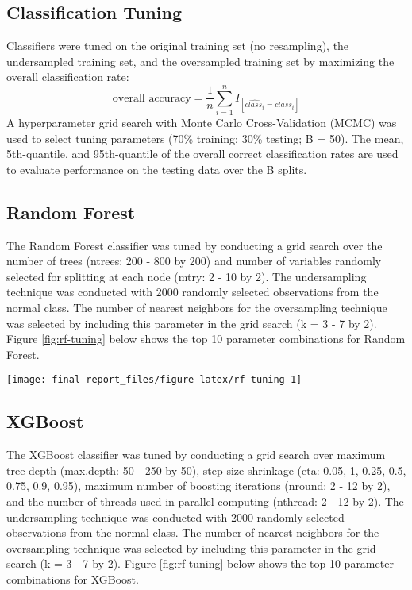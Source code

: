 \clearpage



\begin{appendix}
\clearpage
\appendix

\section{\texorpdfstring{Classification Tuning
\label{app:tuning}}{Classification Tuning }}\label{classification-tuning}

Classifiers were tuned on the original training set (no resampling), the
undersampled training set, and the oversampled training set by
maximizing the overall classification rate:
\[\text{overall accuracy} = \frac{1}{n}\sum_{i=1}^{n} I_{[\widehat{class_i}=class_i]}\]
A hyperparameter grid search with Monte Carlo Cross-Validation (MCMC)
was used to select tuning parameters (70\% training; 30\% testing; B =
50). The mean, 5th-quantile, and 95th-quantile of the overall correct
classification rates are used to evaluate performance on the testing
data over the B splits.

\subsection{\texorpdfstring{Random Forest
\label{app:rf-tuning}}{Random Forest }}\label{random-forest}

The Random Forest classifier was tuned by conducting a grid search over
the number of trees (ntrees: 200 - 800 by 200) and number of variables
randomly selected for splitting at each node (mtry: 2 - 10 by 2). The
undersampling technique was conducted with 2000 randomly selected
observations from the normal class. The number of nearest neighbors for
the oversampling technique was selected by including this parameter in
the grid search (k = 3 - 7 by 2). Figure \ref{fig:rf-tuning} below shows
the top 10 parameter combinations for Random Forest.

\begin{center}\texttt{[image: final-report\_files/figure-latex/rf-tuning-1]} \end{center}

\subsection{\texorpdfstring{XGBoost
\label{app:xgb-tuning}}{XGBoost }}\label{xgboost}

The XGBoost classifier was tuned by conducting a grid search over
maximum tree depth (max.depth: 50 - 250 by 50), step size shrinkage
(eta: 0.05, 1, 0.25, 0.5, 0.75, 0.9, 0.95), maximum number of boosting
iterations (nround: 2 - 12 by 2), and the number of threads used in
parallel computing (nthread: 2 - 12 by 2). The undersampling technique
was conducted with 2000 randomly selected observations from the normal
class. The number of nearest neighbors for the oversampling technique
was selected by including this parameter in the grid search (k = 3 - 7
by 2). Figure \ref{fig:rf-tuning} below shows the top 10 parameter
combinations for XGBoost.


\end{appendix}
